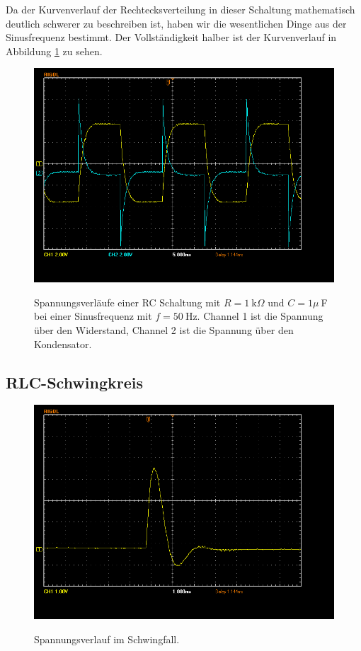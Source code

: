 \documentclass{article}
\begin{document}
Da der Kurvenverlauf der Rechtecksverteilung in dieser Schaltung mathematisch deutlich schwerer zu beschreiben ist, haben wir die wesentlichen Dinge aus der Sinusfrequenz bestimmt. Der Vollständigkeit halber ist der Kurvenverlauf in Abbildung \ref{fig:schaltung1_rechteck} zu sehen.

\begin{figure}[H]
\caption{Spannungsverläufe einer RC Schaltung mit $R=1~$k$\Omega$ und $C=1\mu~$F bei einer Sinusfrequenz mit $f=50~$Hz. Channel 1 ist die Spannung über den Widerstand, Channel 2 ist die Spannung über den Kondensator.}
\label{fig:schaltung1_rechteck}
{\centering
\includegraphics[scale=0.4]{winkler/Schaltung_1_Rechteck.png}}
\end{figure}




\subsection{RLC-Schwingkreis}




\begin{figure}[H]
\caption{Spannungsverlauf im Schwingfall.}
\label{fig:schwing}
{\centering
\includegraphics[scale=0.4]{winkler/schwingfall.png}}
\end{figure}
\end{document}
